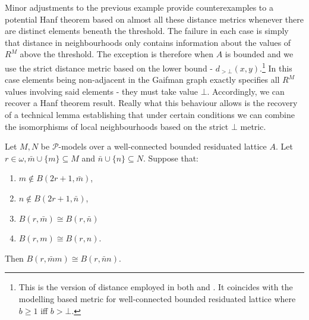 \documentclass{lmcs} %
\newcommand{\?}{\ensuremath{\mkern0.4\thinmuskip}}
\let\isom=\cong%
\newcommand{\CP}{\mathcal{P}}
\begin{document}
Minor adjustments to the previous example provide counterexamples to a potential Hanf theorem based on almost all these distance metrics whenever there are distinct elements beneath the threshold. The failure in each case is simply that distance in neighbourhoods only contains information about the values of $R^M$ above the threshold. The exception is therefore when $A$ is bounded and we use the strict distance metric based on the lower bound - $d_{>\bot}(x,y)$.\footnote{This is the version of distance employed in both \cite{BiziereGradelNaaf23:Localitysemiring} and \cite{WildSchroderPattinsonKonig18:fuzzyvanBenthem}. It coincides with the modelling based metric for well-connected bounded residuated lattice where $b\geq 1$ iff $b>\bot$.} In this case elements being non-adjacent in the Gaifman graph exactly specifies all $R^M$ values involving said elements - they must take value $\bot$. Accordingly, we can recover a Hanf theorem result. Really what this behaviour allows is the recovery of a technical lemma establishing that under certain conditions we can combine the isomorphisms of local neighbourhoods based on the strict $\bot$ metric. 
\begin{lem}
    Let $M,N$ be $\CP$-models over a well-connected bounded residuated lattice $A$. Let $r\in\omega, \bar{m}\cup\{m\}\subseteq M$ and $\bar{n}\cup\{n\}\subseteq N$. Suppose that:\begin{enumerate}[label=\roman*.]
        \item $m\not\in B(2r+1,\bar{m})$,
        \item $n\not\in B(2r+1,\bar{n})$,
        \item $B(r,\bar{m})\isom B(r,\bar{n})$
        \item $B(r,m)\isom B(r,n)$.
    \end{enumerate}
    Then $B(r,\bar{m}m)\isom B(r,\bar{n}n)$. 
\end{lem}
\end{document}
